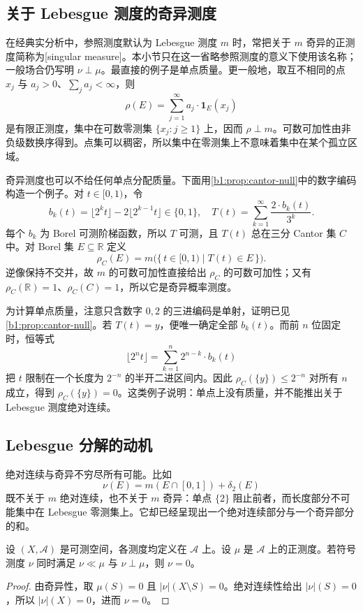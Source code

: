 \subsection{关于 Lebesgue 测度的奇异测度}
\label{b1:subsec:060303}

在经典实分析中，参照测度默认为 Lebesgue 测度 \(m\) 时，常把关于 \(m\) 奇异的正测度简称为[singular measure]。本小节只在这一省略参照测度的意义下使用该名称；一般场合仍写明 \(\nu\perp\mu\)。最直接的例子是单点质量。更一般地，取互不相同的点 \(x_j\) 与 \(a_j>0\)、\(\sum_ja_j<\infty\)，则
\[
\rho(E)=\sum_{j=1}^{\infty}a_j\cdot\mathbf1_E(x_j)
\]
是有限正测度，集中在可数零测集 \(\{x_j:j\geq1\}\) 上，因而 \(\rho\perp m\)。可数可加性由非负级数换序得到。点集可以稠密，所以集中在零测集上不意味着集中在某个孤立区域。

\ProseParagraphBreak

奇异测度也可以不给任何单点分配质量。下面用\cref{b1:prop:cantor-null}中的数字编码构造一个例子。对 \(t\in[0,1)\)，令
\[
b_k(t)=\lfloor2^kt\rfloor-2\lfloor2^{k-1}t\rfloor\in\{0,1\},
\quad
T(t)=\sum_{k=1}^{\infty}\frac{2\cdot b_k(t)}{3^k}.
\]
每个 \(b_k\) 为 Borel 可测阶梯函数，所以 \(T\) 可测，且 \(T(t)\) 总在三分 Cantor 集 \(C\) 中。对 Borel 集 \(E\subseteq\mathbb R\) 定义
\[
\rho_C(E)=m\bigl(\{\,t\in[0,1)\mid T(t)\in E\,\}\bigr).
\]
逆像保持不交并，故 \(m\) 的可数可加性直接给出 \(\rho_C\) 的可数可加性；又有 \(\rho_C(\mathbb R)=1\)、\(\rho_C(C)=1\)，所以它是奇异概率测度。

\ProseParagraphBreak

为计算单点质量，注意只含数字 \(0,2\) 的三进编码是单射，证明已见\cref{b1:prop:cantor-null}。若 \(T(t)=y\)，便唯一确定全部 \(b_k(t)\)。而前 \(n\) 位固定时，恒等式
\[
\lfloor2^nt\rfloor=\sum_{k=1}^n2^{n-k}\cdot b_k(t)
\]
把 \(t\) 限制在一个长度为 \(2^{-n}\) 的半开二进区间内。因此 \(\rho_C(\{y\})\leq2^{-n}\) 对所有 \(n\) 成立，得到 \(\rho_C(\{y\})=0\)。这类例子说明：单点上没有质量，并不能推出关于 Lebesgue 测度绝对连续。

\subsection{Lebesgue 分解的动机}
\label{b1:subsec:060304}

绝对连续与奇异不穷尽所有可能。比如
\[
\nu(E)=m(E\cap[0,1])+\delta_2(E)
\]
既不关于 \(m\) 绝对连续，也不关于 \(m\) 奇异：单点 \(\{2\}\) 阻止前者，而长度部分不可能集中在 Lebesgue 零测集上。它却已经呈现出一个绝对连续部分与一个奇异部分的和。

\begin{proposition}\label{b1:prop:ac-singular-zero}
设 \((X,\mathcal A)\) 是可测空间，各测度均定义在 \(\mathcal A\) 上。设 \(\mu\) 是 \(\mathcal A\) 上的正测度。若符号测度 \(\nu\) 同时满足 \(\nu\ll\mu\) 与 \(\nu\perp\mu\)，则 \(\nu=0\)。
\end{proposition}
\begin{proof}
由奇异性，取 \(\mu(S)=0\) 且 \(|\nu|(X\setminus S)=0\)。绝对连续性给出 \(|\nu|(S)=0\)，所以 \(|\nu|(X)=0\)，进而 \(\nu=0\)。
\end{proof}

